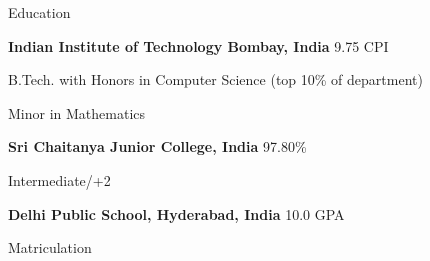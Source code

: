 
\begin{rubric}{Education}

\entry*[2019 -- 2023]%
	\textbf{Indian Institute of Technology Bombay, India} \hfill 9.75 CPI
	\par B.Tech. with Honors in Computer Science \hfill (top 10\% of department)
	\par Minor in Mathematics


\entry*[2017 -- 2019]%
	\textbf{Sri Chaitanya Junior College, India} \hfill 97.80\% \par
	Intermediate/+2
	

\entry*[2010 -- 2017]%
	\textbf{Delhi Public School, Hyderabad, India} \hfill 10.0 GPA \par
	Matriculation
\end{rubric}